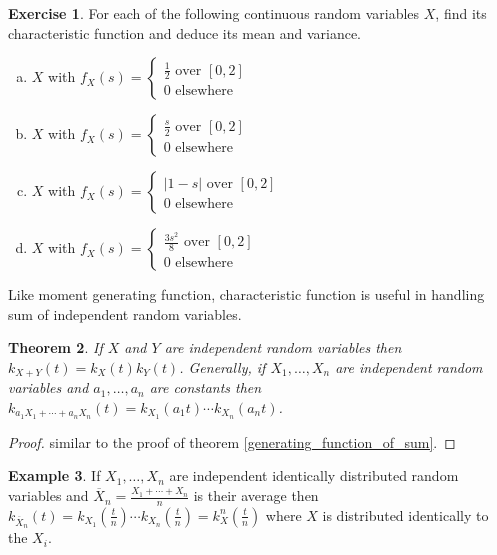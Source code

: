 \documentclass[12pt]{amsart}
\newtheorem{theorem}{Theorem}[section]
\theoremstyle{definition}
\newtheorem{example}[theorem]{Example}
\newtheorem{exercise}[theorem]{Exercise}
\begin{document}
\begin{exercise} For each of the following continuous random variables $X$, find its characteristic function and deduce its mean and variance.
\begin{enumerate}[a.]
\item $X$ with $f_X(s) =  \begin{cases} \frac{1}{2} \text{ over } [0,2] \\ 0 \text{ elsewhere} \end{cases}$
\item $X$ with $f_X(s) =  \begin{cases} \frac{s}{2} \text{ over } [0,2] \\ 0 \text{ elsewhere} \end{cases}$
\item $X$ with $f_X(s) =  \begin{cases} |1-s| \text{ over } [0,2] \\ 0 \text{ elsewhere} \end{cases}$
\item $X$ with $f_X(s) =  \begin{cases} \frac{3s^2}{8} \text{ over } [0,2] \\ 0 \text{ elsewhere} \end{cases}$
\end{enumerate}
\end{exercise}

Like moment generating function, characteristic function is useful in handling sum of independent random variables.

\begin{theorem} \label{characteristic_function_of_sum} If $X$ and $Y$ are independent random variables then $k_{X+Y}(t) = k_X(t)k_Y(t)$. Generally, if $X_1, \dots , X_n$ are independent random variables and $a_1, \dots ,a_n$ are constants then $k_{a_1X_1 + \cdots + a_nX_n}(t) = k_{X_1}(a_1t) \cdots k_{X_n}(a_n t)$.
\end{theorem}
\begin{proof} similar to the proof of theorem \ref{generating_function_of_sum}.
\end{proof}

\begin{example} If $X_1, \dots , X_n$ are independent identically distributed random variables and $\overline{X}_n = \frac{X_1 + \cdots + X_n}{n}$ is their average then $k_{\overline{X}_n}(t) = k_{X_1}(\frac{t}{n}) \cdots k_{X_n}(\frac{t}{n}) = k_X^n(\frac{t}{n})$ where $X$ is distributed identically to the $X_i$.
\end{example}
\end{document}
